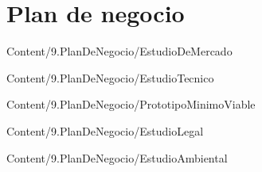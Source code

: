 \section{Plan de negocio}

{Content/9.PlanDeNegocio/EstudioDeMercado}

{Content/9.PlanDeNegocio/EstudioTecnico}

{Content/9.PlanDeNegocio/PrototipoMinimoViable}

{Content/9.PlanDeNegocio/EstudioLegal}

{Content/9.PlanDeNegocio/EstudioAmbiental}